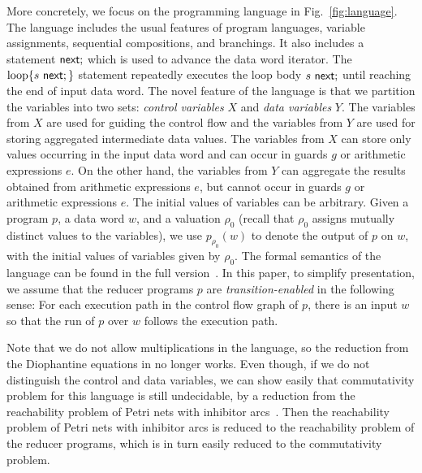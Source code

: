 More concretely, we focus on the programming language in Fig.~\ref{fig:language}. The language includes the usual features of program languages, variable assignments, sequential compositions, and branchings. It also includes a statement $\mathsf{next};$ which is used to advance the data word iterator. The $\loopL{s\ \nnext;}$ statement repeatedly executes the loop body $s\ \mathsf{next};$ until reaching the end of input data word.
The novel feature of the language is that we partition the variables into two sets: \emph{control variables} $X$ and \emph{data variables} $Y$.
The variables from $X$ are used for guiding the control flow and the variables from $Y$ are used for storing aggregated intermediate data values.
The variables from $X$ can store only values occurring in the input data word and can occur in guards $g$ or arithmetic expressions $e$.
On the other hand, the variables from $Y$ can aggregate the results obtained from arithmetic expressions $e$, but cannot occur in guards $g$ or arithmetic expressions $e$. The initial values of variables can be arbitrary.
Given a program $p$, a data word $w$, and a valuation $\rho_0$ (recall that $\rho_0$ assigns mutually distinct values to the variables), we use $p_{\rho_0}(w)$ to denote the output of $p$ on $w$, with the initial values of variables given by $\rho_0$. The formal semantics of the language can be found in the full version~\cite{full-version}. In this paper, to simplify presentation, we assume that the reducer programs $p$ are \emph{transition-enabled} in the following sense: For each execution path in the control flow graph of $p$, there is an input $w$ so that the run of $p$ over $w$ follows the execution path. %

Note that we do not allow multiplications in the language, so the reduction from the Diophantine equations in \cite{CHSW15} no longer works. Even though, if we do not distinguish the control and data variables, we can show easily that commutativity problem for this language is still undecidable, by a reduction from the reachability problem of Petri nets with inhibitor arcs~\cite{Min71,Rei08}.
Then the reachability problem of Petri nets with inhibitor arcs is reduced to the reachability problem of the reducer programs, which is in turn easily reduced to the commutativity problem.

